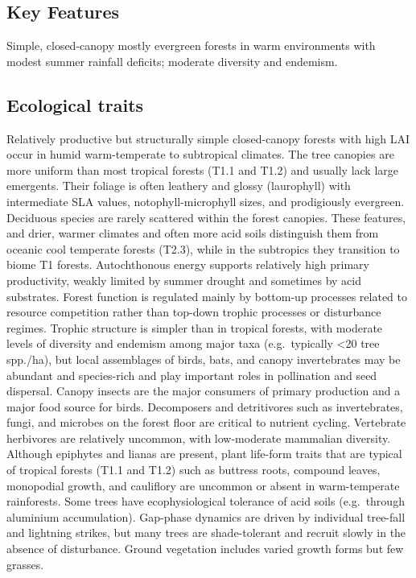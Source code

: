 \documentclass[
  letterpaper,
  DIV=11,
  numbers=noendperiod]{scrartcl}
\begin{document}
\subsection{Key Features}\label{key-features-76}

Simple, closed-canopy mostly evergreen forests in warm environments with
modest summer rainfall deficits; moderate diversity and endemism.

\subsection{Ecological traits}\label{ecological-traits-76}

Relatively productive but structurally simple closed-canopy forests with
high LAI occur in humid warm-temperate to subtropical climates. The tree
canopies are more uniform than most tropical forests (T1.1 and T1.2) and
usually lack large emergents. Their foliage is often leathery and glossy
(laurophyll) with intermediate SLA values, notophyll-microphyll sizes,
and prodigiously evergreen. Deciduous species are rarely scattered
within the forest canopies. These features, and drier, warmer climates
and often more acid soils distinguish them from oceanic cool temperate
forests (T2.3), while in the subtropics they transition to biome T1
forests. Autochthonous energy supports relatively high primary
productivity, weakly limited by summer drought and sometimes by acid
substrates. Forest function is regulated mainly by bottom-up processes
related to resource competition rather than top-down trophic processes
or disturbance regimes. Trophic structure is simpler than in tropical
forests, with moderate levels of diversity and endemism among major taxa
(e.g.~typically \textless20 tree spp./ha), but local assemblages of
birds, bats, and canopy invertebrates may be abundant and species-rich
and play important roles in pollination and seed dispersal. Canopy
insects are the major consumers of primary production and a major food
source for birds. Decomposers and detritivores such as invertebrates,
fungi, and microbes on the forest floor are critical to nutrient
cycling. Vertebrate herbivores are relatively uncommon, with
low-moderate mammalian diversity. Although epiphytes and lianas are
present, plant life-form traits that are typical of tropical forests
(T1.1 and T1.2) such as buttress roots, compound leaves, monopodial
growth, and cauliflory are uncommon or absent in warm-temperate
rainforests. Some trees have ecophysiological tolerance of acid soils
(e.g.~through aluminium accumulation). Gap-phase dynamics are driven by
individual tree-fall and lightning strikes, but many trees are
shade-tolerant and recruit slowly in the absence of disturbance. Ground
vegetation includes varied growth forms but few grasses.
\end{document}
